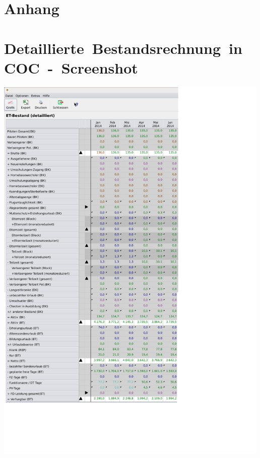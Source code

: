 \documentclass [12pt, a4paper, oneside, titlepage, ngerman]{article}
\begin{document}
\newpage

\setcounter{page}{4}
\section* {Anhang}
\appendix
{}
\section{\mbox{Detaillierte Bestandsrechnung in COC - Screenshot}} 
\label{bestandscreen}
\begin{flushleft}
\includegraphics[width = 500px, keepaspectratio]{Bestand.png}
\end{flushleft}








\newpage
\end{document}
